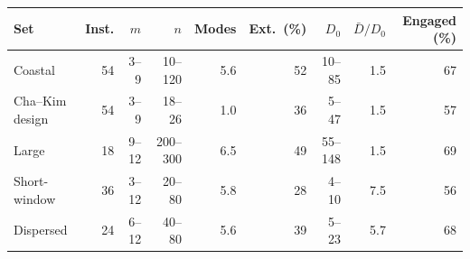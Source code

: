 \begin{tabular*}{\textwidth}{@{\extracolsep\fill}lrrrrrrrr@{\extracolsep\fill}}
\toprule
\textbf{Set} & \textbf{Inst.} & $m$ & $n$ & \textbf{Modes} & \textbf{Ext.\ (\%)} & $D_0$ & $\bar D/D_0$ & \textbf{Engaged (\%)} \\
\midrule
Coastal & 54 & 3--9 & 10--120 & 5.6 & 52 & 10--85 & 1.5 & 67 \\
Cha--Kim design & 54 & 3--9 & 18--26 & 1.0 & 36 & 5--47 & 1.5 & 57 \\
Large & 18 & 9--12 & 200--300 & 6.5 & 49 & 55--148 & 1.5 & 69 \\
Short-window & 36 & 3--12 & 20--80 & 5.8 & 28 & 4--10 & 7.5 & 56 \\
Dispersed & 24 & 6--12 & 40--80 & 5.6 & 39 & 5--23 & 5.7 & 68 \\
\bottomrule
\end{tabular*}
